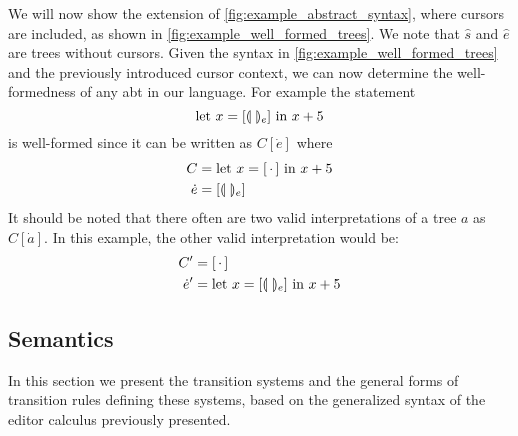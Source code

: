 \documentclass[sigplan,screen]{acmart}
\begin{document}
\begin{example}\label{ex:well_formed_trees}
   We will now show the extension of \cref{fig:example_abstract_syntax}, where cursors are included, as shown in \cref{fig:example_well_formed_trees}. We note that $\hat{s}$ and $\hat{e}$ are trees without cursors.
    Given the syntax in \cref{fig:example_well_formed_trees} and the previously introduced cursor context, we can now determine the well-formedness of any abt in our language. For example the statement
    \begin{equation*}
        \text{let $x=[\llparenthesis \ \rrparenthesis_e]$ in $x+5$}
    \end{equation*}
    is well-formed since it can be written as $C[\dot{e}]$ where
    \begin{align*}
        C &= \text{let $x=[ \, \cdot \, ]$ in $x+5$} \\
        \dot{e}&= [\llparenthesis \ \rrparenthesis_e]
    \end{align*}
    It should be noted that there often are two valid interpretations of a tree $a$ as $C[\dot{a}]$. In this example, the other valid interpretation would be:
    \begin{align*}
        C' &= [ \, \cdot \, ] \\
        \dot{e}' &= \text{let $x=[\llparenthesis \ \rrparenthesis_e]$ in $x+5$}
    \end{align*}
\end{example}

\subsection{Semantics}
In this section we present the transition systems and the general forms of transition rules defining these systems, based on the generalized syntax of the editor calculus previously presented. 
\end{document}
